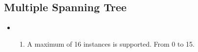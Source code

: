 
\subsection{Multiple Spanning Tree}

\begin{itemize}
    \item {}
    \begin{enumerate}
        \item A maximum of 16 instances is supported. {\footnotesize From 0 to 15.}
    \end{enumerate}
\end{itemize}
        